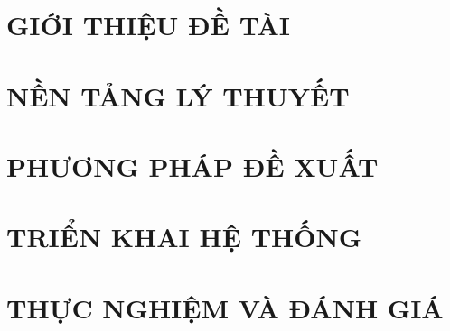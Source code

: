 \documentclass[a4paper,13pt,3p,twoside]{report}
\theoremstyle{definition}
\begin{document}
\renewcommand{\listtablename}{DANH MỤC BẢNG BIỂU}
{\let\oldnumberline\numberline
\renewcommand{\numberline}{Bảng~\oldnumberline}
\listoftables}

\glsaddall 
\renewcommand*{\acronymname}{DANH MỤC THUẬT NGỮ VÀ TỪ VIẾT TẮT}
\renewcommand*{\entryname}{Thuật ngữ}
\renewcommand*{\descriptionname}{Ý nghĩa}
\printnoidxglossaries

\renewcommand\appendixname{PHỤ LỤC}
\renewcommand\appendixpagename{PHỤ LỤC}
\renewcommand\appendixtocname{PHỤ LỤC}





\newpage
{}

\pagestyle{fancy}
\fancyhf{}
\fancyhead[RE, LO]{\leftmark}
\fancyfoot[RE, LO]{\thepage}

\chapter{GIỚI THIỆU ĐỀ TÀI}

\newpage
\chapter{NỀN TẢNG LÝ THUYẾT}



\newpage
\chapter{PHƯƠNG PHÁP ĐỀ XUẤT}


\newpage
\chapter{TRIỂN KHAI HỆ THỐNG}


\newpage
\chapter{THỰC NGHIỆM VÀ ĐÁNH GIÁ}

\end{document}
